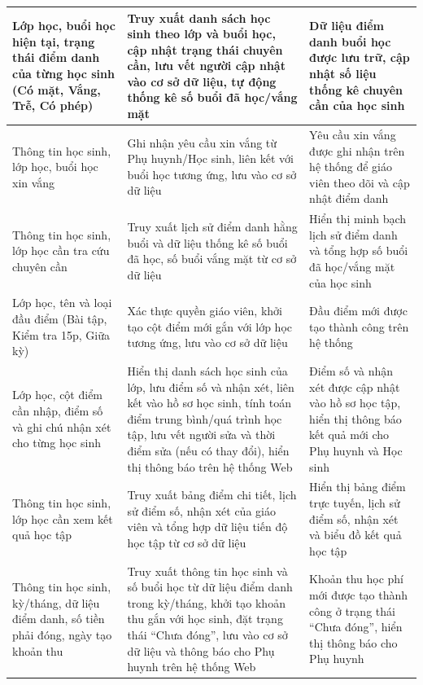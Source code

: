 \begin{longtable}{|m{4.5cm}|m{5.8cm}|m{4.5cm}|}
    Lớp học, buổi học hiện tại, trạng thái điểm danh của từng học sinh (Có mặt, Vắng, Trễ, Có phép) & 
    Truy xuất danh sách học sinh theo lớp và buổi học, cập nhật trạng thái chuyên cần, lưu vết người cập nhật vào cơ sở dữ liệu, tự động thống kê số buổi đã học/vắng mặt & 
    Dữ liệu điểm danh buổi học được lưu trữ, cập nhật số liệu thống kê chuyên cần của học sinh \\ \hline

    Thông tin học sinh, lớp học, buổi học xin vắng & 
    Ghi nhận yêu cầu xin vắng từ Phụ huynh/Học sinh, liên kết với buổi học tương ứng, lưu vào cơ sở dữ liệu & 
    Yêu cầu xin vắng được ghi nhận trên hệ thống để giáo viên theo dõi và cập nhật điểm danh \\ \hline

    Thông tin học sinh, lớp học cần tra cứu chuyên cần & 
    Truy xuất lịch sử điểm danh hằng buổi và dữ liệu thống kê số buổi đã học, số buổi vắng mặt từ cơ sở dữ liệu & 
    Hiển thị minh bạch lịch sử điểm danh và tổng hợp số buổi đã học/vắng mặt của học sinh \\ \hline

    Lớp học, tên và loại đầu điểm (Bài tập, Kiểm tra 15p, Giữa kỳ) & 
    Xác thực quyền giáo viên, khởi tạo cột điểm mới gắn với lớp học tương ứng, lưu vào cơ sở dữ liệu & 
    Đầu điểm mới được tạo thành công trên hệ thống \\ \hline

    Lớp học, cột điểm cần nhập, điểm số và ghi chú nhận xét cho từng học sinh & 
    Hiển thị danh sách học sinh của lớp, lưu điểm số và nhận xét, liên kết vào hồ sơ học sinh, tính toán điểm trung bình/quá trình học tập, lưu vết người sửa và thời điểm sửa (nếu có thay đổi), hiển thị thông báo trên hệ thống Web & 
    Điểm số và nhận xét được cập nhật vào hồ sơ học tập, hiển thị thông báo kết quả mới cho Phụ huynh và Học sinh \\ \hline

    Thông tin học sinh, lớp học cần xem kết quả học tập & 
    Truy xuất bảng điểm chi tiết, lịch sử điểm số, nhận xét của giáo viên và tổng hợp dữ liệu tiến độ học tập từ cơ sở dữ liệu & 
    Hiển thị bảng điểm trực tuyến, lịch sử điểm số, nhận xét và biểu đồ kết quả học tập \\ \hline

    Thông tin học sinh, kỳ/tháng, dữ liệu điểm danh, số tiền phải đóng, ngày tạo khoản thu & 
    Truy xuất thông tin học sinh và số buổi học từ dữ liệu điểm danh trong kỳ/tháng, khởi tạo khoản thu gắn với học sinh, đặt trạng thái ``Chưa đóng'', lưu vào cơ sở dữ liệu và thông báo cho Phụ huynh trên hệ thống Web & 
    Khoản thu học phí mới được tạo thành công ở trạng thái ``Chưa đóng'', hiển thị thông báo cho Phụ huynh \\ \hline


\end{longtable}
